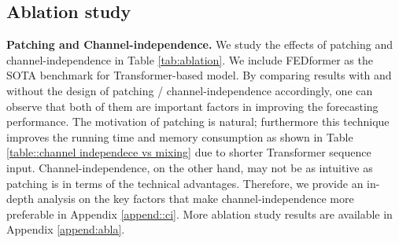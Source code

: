\documentclass{article} %
\begin{document}
\subsection{Ablation study}
\label{sec::ablation}

\textbf{Patching and Channel-independence.} We study the effects of patching and channel-independence in Table \ref{tab:ablation}. We include FEDformer as the SOTA benchmark for Transformer-based model.  By comparing results with and without the design of patching / channel-independence accordingly, one can observe that both of them are important factors in improving the forecasting performance. The motivation of patching is natural; furthermore this technique improves the running time and memory consumption as shown in Table \ref{table::channel independece vs mixing} due to shorter Transformer sequence input. Channel-independence, on the other hand, may not be as intuitive as patching is in terms of the technical advantages. Therefore, we provide an in-depth analysis on the key factors that make channel-independence more preferable in Appendix \ref{append::ci}. More ablation study results are available in Appendix \ref{append:abla}.

\end{document}
